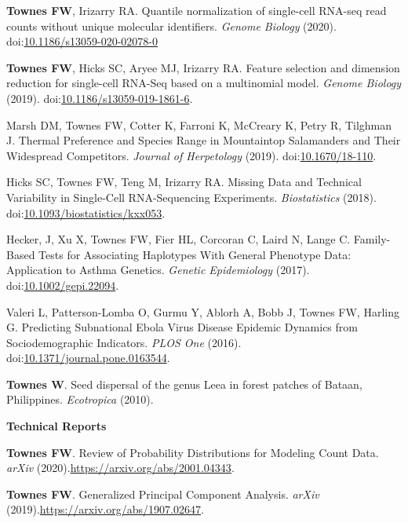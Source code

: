 \documentclass[10pt]{article}
\newcommand\doilink[1]{\href{https://dx.doi.org/#1}{#1}}
\newcommand\doi[1]{doi:\doilink{#1}}
\newcommand\arxiv[1]{\url{https://arxiv.org/abs/#1}}
\begin{document}
\begin{enumerate}[label= {[\arabic*]}]
\item {\bf Townes FW}, Irizarry RA. Quantile normalization of single-cell RNA-seq read counts without unique molecular identifiers. {\it Genome Biology} (2020). \doi{10.1186/s13059-020-02078-0}
\item {\bf Townes FW}, Hicks SC, Aryee MJ, Irizarry RA. Feature selection and dimension reduction for single-cell RNA-Seq based on a multinomial model. {\it Genome Biology} (2019). \doi{10.1186/s13059-019-1861-6}.
\item Marsh DM, Townes FW, Cotter K, Farroni K, McCreary K, Petry R, Tilghman J. Thermal Preference and Species Range in Mountaintop Salamanders and Their Widespread Competitors. {\it Journal of Herpetology} (2019). \doi{10.1670/18-110}.
\item Hicks SC, Townes FW, Teng M, Irizarry RA. Missing Data and Technical Variability in Single-Cell RNA-Sequencing Experiments. {\it Biostatistics} (2018). \doi{10.1093/biostatistics/kxx053}.
\item Hecker, J, Xu X, Townes FW, Fier HL, Corcoran C, Laird N, Lange C. Family-Based Tests for Associating Haplotypes With General Phenotype Data: Application to Asthma Genetics. {\it Genetic Epidemiology} (2017). \doi{10.1002/gepi.22094}.
\item Valeri L, Patterson-Lomba O, Gurmu Y, Ablorh A, Bobb J, Townes FW, Harling G. Predicting Subnational Ebola Virus Disease Epidemic Dynamics from Sociodemographic Indicators. {\it PLOS One} (2016). \doi{10.1371/journal.pone.0163544}.
\item {\bf Townes W}. Seed dispersal of the genus Leea in forest patches of Bataan, Philippines. {\it Ecotropica } (2010).
\end{enumerate}

\textbf{Technical Reports}
\begin{enumerate}[label= {[\arabic*]}]
\item {\bf Townes FW}. Review of Probability Distributions for Modeling Count Data. {\it arXiv} (2020).\newline \arxiv{2001.04343}.
\item {\bf Townes FW}. Generalized Principal Component Analysis. {\it arXiv} (2019).\newline \arxiv{1907.02647}.
\end{enumerate}
\end{document}
